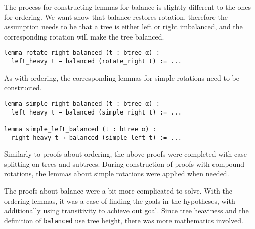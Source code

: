 The process for constructing lemmas for balance is slightly different to the ones for ordering. We want show that balance restores rotation, therefore the assumption needs to be that a tree is either left or right imbalanced, and the corresponding rotation will make the tree balanced.

\begin{lstlisting}
lemma rotate_right_balanced (t : btree α) :
  left_heavy t → balanced (rotate_right t) := ...
\end{lstlisting}

As with ordering, the corresponding lemmas for simple rotations need to be constructed.

\begin{lstlisting}
lemma simple_right_balanced (t : btree α) :
  left_heavy t → balanced (simple_right t) := ...
  
lemma simple_left_balanced (t : btree α) :
  right_heavy t → balanced (simple_left t) := ...
\end{lstlisting}

Similarly to proofs about ordering, the above proofs were completed with case splitting on trees and subtrees. During construction of proofs with compound rotations, the lemmas about simple rotations were applied when needed. 

The proofs about balance were a bit more complicated to solve. With the ordering lemmas, it was a case of finding the goals in the hypotheses, with additionally using transitivity to achieve out goal. Since tree heaviness and the definition of \lstinline{balanced} use tree height, there was more mathematics involved. 
